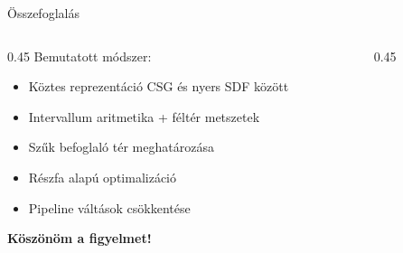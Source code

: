 \documentclass[xcolor=dvipsnames,aspectratio=169,9pt]{beamer}
\renewcommand{\emph}[1]{\textcolor{FrameBG2}{\textbf{#1}}}
\begin{document}
\begin{frame}{Összefoglalás}
\begin{columns}[T]
\begin{column}{0.45\textwidth}
Bemutatott módszer:

\begin{itemize}
    \item Köztes reprezentáció CSG és nyers SDF között
    \item Intervallum aritmetika + féltér metszetek
    \item Szűk befoglaló tér meghatározása
    \item Részfa alapú optimalizáció
    \item Pipeline váltások csökkentése
\end{itemize}
\vfill
\centering
\Huge \emph{Köszönöm a figyelmet!}

\end{column}
\begin{column}{0.45\textwidth}
\end{column}
\end{columns}
\end{frame}
\end{document}
